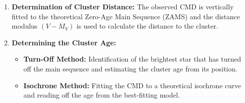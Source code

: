 \documentclass[12pt,a4paper]{article}
\begin{document}
\begin{enumerate}
    \item \textbf{Determination of Cluster Distance:} The observed CMD is vertically fitted to the theoretical Zero-Age Main Sequence (ZAMS) and the distance modulus $(V - M_V)$ is used to calculate the distance to the cluster.

    \item \textbf{Determining the Cluster Age:}
    \begin{itemize}
        \item \textbf{Turn-Off Method:} Identification of the brightest star that has turned off the main sequence and estimating the cluster age from its position.
        \item \textbf{Isochrone Method:} Fitting the CMD to a theoretical isochrone curve and reading off the age from the best-fitting model.
    \end{itemize}
\end{enumerate}
\end{document}
